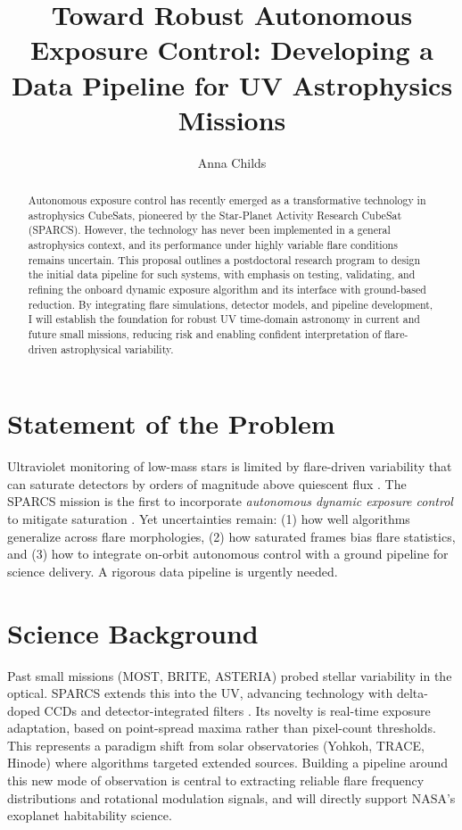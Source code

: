 \documentclass[final,letterpaper,oneside,12pt]{article}
\title{Toward Robust Autonomous Exposure Control: Developing a Data Pipeline for UV Astrophysics Missions}
\author{Anna Childs}
\begin{document}
\maketitle

\begin{abstract}
Autonomous exposure control has recently emerged as a transformative technology in astrophysics CubeSats, pioneered by the Star-Planet Activity Research CubeSat (SPARCS). However, the technology has never been implemented in a general astrophysics context, and its performance under highly variable flare conditions remains uncertain. This proposal outlines a postdoctoral research program to design the initial data pipeline for such systems, with emphasis on testing, validating, and refining the onboard dynamic exposure algorithm and its interface with ground-based reduction. By integrating flare simulations, detector models, and pipeline development, I will establish the foundation for robust UV time-domain astronomy in current and future small missions, reducing risk and enabling confident interpretation of flare-driven astrophysical variability.
\end{abstract}

\section{Statement of the Problem}
Ultraviolet monitoring of low-mass stars is limited by flare-driven variability that can saturate detectors by orders of magnitude above quiescent flux \citep{Loyd2018,MacGregor2021}. The SPARCS mission is the first to incorporate \emph{autonomous dynamic exposure control} to mitigate saturation \citep{Ramiaramanantsoa2021}. Yet uncertainties remain: (1) how well algorithms generalize across flare morphologies, (2) how saturated frames bias flare statistics, and (3) how to integrate on-orbit autonomous control with a ground pipeline for science delivery. A rigorous data pipeline is urgently needed.

\section{Science Background}
Past small missions (MOST, BRITE, ASTERIA) probed stellar variability in the optical. SPARCS extends this into the UV, advancing technology with delta-doped CCDs and detector-integrated filters \citep{Shkolnik2025}. Its novelty is real-time exposure adaptation, based on point-spread maxima rather than pixel-count thresholds. This represents a paradigm shift from solar observatories (Yohkoh, TRACE, Hinode) where algorithms targeted extended sources. Building a pipeline around this new mode of observation is central to extracting reliable flare frequency distributions and rotational modulation signals, and will directly support NASA’s exoplanet habitability science.
\end{document}
